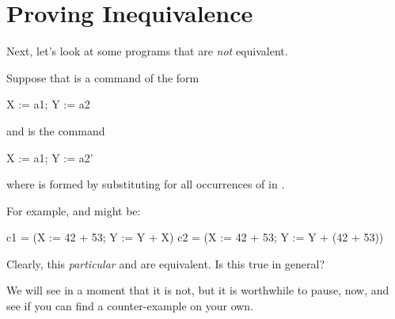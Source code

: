 \documentclass[12pt]{report}
\begin{document}
\section{Proving Inequivalence}



 Next, let's look at some programs that are \textit{not} equivalent. 

 Suppose that  is a command of the form


       X := a1; Y := a2


    and  is the command


       X := a1; Y := a2'


    where  is formed by substituting  for all occurrences
    of  in .


    For example,  and  might be:


       c1  =  (X := 42 + 53;
               Y := Y + X)
       c2  =  (X := 42 + 53;
               Y := Y + (42 + 53))


    Clearly, this \textit{particular}  and  are equivalent.  Is this
    true in general? 

 We will see in a moment that it is not, but it is worthwhile
    to pause, now, and see if you can find a counter-example on your
    own. 
\end{document}
